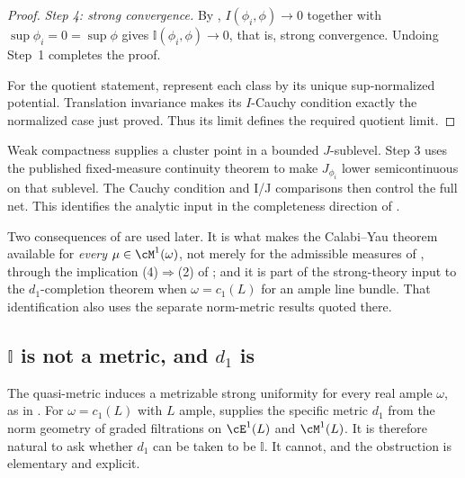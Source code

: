 \begin{proof}
\emph{Step 4: strong convergence.}  By
, $I(\phi_i,\phi)\to0$ together with
$\sup\phi_i=0=\sup\phi$ gives $\mathbb I(\phi_i,\phi)\to0$, that is,
strong convergence.  Undoing Step~1 completes the proof.

For the quotient statement, represent each class by its unique
sup-normalized potential. Translation invariance makes its $I$-Cauchy
condition exactly the normalized case just proved. Thus its limit defines
the required quotient limit.
\end{proof}

\begin{remark}
\label{rem:ch48-completeness-weight}
Weak compactness supplies a cluster point in a bounded $J$-sublevel.
Step 3 uses the published fixed-measure continuity theorem
\cite[Proposition~9.19]{BJ22} to make $J_{\phi_i}$ lower semicontinuous
on that sublevel. The Cauchy condition and I/J comparisons then control
the full net. This identifies the analytic input in the completeness
direction of \cite[Theorem~12.8]{BJ22}.

Two consequences of  are used later.  It is
what makes the Calabi--Yau theorem  available for
\emph{every} $\mu\in\cM^1(\omega)$, not merely for the admissible
measures of , through the implication
(4)$\Rightarrow$(2) of ; and it is
part of the strong-theory input to the $d_1$-completion theorem
 when $\omega=c_1(L)$ for an
ample line bundle. That identification also uses the separate
norm-metric results quoted there.
\end{remark}

\subsection{\texorpdfstring{$\mathbb I$}{I} is not a metric, and \texorpdfstring{$d_1$}{d1} is}
\label{sec:ch48-not-a-metric}

The quasi-metric induces a metrizable strong uniformity for every
real ample $\omega$, as in \cite[Theorem~12.4]{BJ22}.
For $\omega=c_1(L)$ with $L$ ample,
 supplies the specific metric
$d_1$ from the norm geometry of graded filtrations on
$\cE^1(L)$ and $\cM^1(L)$.  It is
therefore natural to ask whether $d_1$ can be taken to be
$\mathbb I$.  It cannot, and the obstruction is elementary and explicit.


